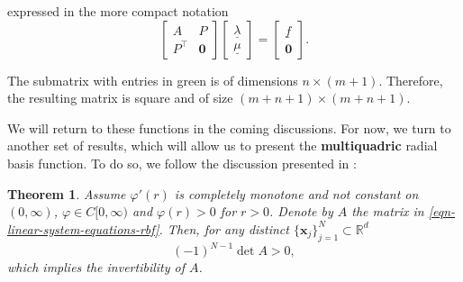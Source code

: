 \documentclass[12pt]{report} %
\newtheorem{theorem}{Theorem}
\newcommand{\tmmathbf}[1]{\ensuremath{\boldsymbol{#1}}}
\begin{document}
expressed in the more compact notation
\begin{equation}
  \left[\begin{array}{cc}
      A        & P            \\
      P^{\top} & \tmmathbf{0}
    \end{array}\right] \left[\begin{array}{c}
      \underline{\lambda} \\
      \underline{\mu}
    \end{array}\right] = \left[\begin{array}{c}
      \underline{f} \\
      \tmmathbf{0}
    \end{array}\right]. \label{eqn-augmented-rbf-poly-system}
\end{equation}

The submatrix with entries in green is of dimensions $n \times (m + 1)$. Therefore, the
resulting matrix is square and of size $(m + n + 1) \times (m + n + 1)$.

We will return to these functions in the coming discussions. For now, we turn to another set of results, which will allow us to present the \textbf{multiquadric} radial basis function. To do so, we follow the discussion presented in \cite{sarra2009multiquadric}:

\begin{theorem}
  Assume $\varphi'(r)$ is completely monotone and not constant on
  $(0, \infty)$, $\varphi \in C [0, \infty)$ and $\varphi (r) > 0$ for $r >
    0$. Denote by $A$ the matrix in \eqref{eqn-linear-system-equations-rbf}. Then,
  for any distinct $\{ \tmmathbf{x}_j \}_{j = 1}^N \subset \mathbb{R}^d$
  \[ (- 1)^{N - 1} \det A > 0, \]
  which implies the invertibility of $A$.
  \label{thm-A-invertible}
\end{theorem}
\end{document}
